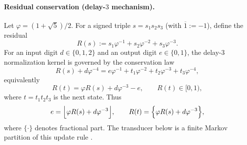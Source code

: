 \paragraph{Residual conservation (delay-$3$ mechanism).}
Let $\varphi=(1+\sqrt5)/2$.
For a signed triple $s=s_1s_2s_3$ (with $\overline{1}:=-1$), define the residual
\[
R(s):=s_1\varphi^{-1}+s_2\varphi^{-2}+s_3\varphi^{-3}.
\]
For an input digit $d\in\{0,1,2\}$ and an output digit $e\in\{0,1\}$, the delay-$3$ normalization kernel is governed by the conservation law
\begin{equation}\label{eq:online-delay3-conservation}
R(s)+d\varphi^{-4}=e\varphi^{-1}+t_1\varphi^{-2}+t_2\varphi^{-3}+t_3\varphi^{-4},
\end{equation}
equivalently
\begin{equation}\label{eq:online-delay3-update}
R(t)=\varphi R(s)+d\varphi^{-3}-e,
\qquad R(t)\in[0,1),
\end{equation}
where $t=t_1t_2t_3$ is the next state.
Thus
\begin{equation}\label{eq:online-delay3-floor}
e=\Bigl\lfloor \varphi R(s)+d\varphi^{-3}\Bigr\rfloor,\qquad
R(t)=\Bigl\{\varphi R(s)+d\varphi^{-3}\Bigr\},
\end{equation}
where $\{\cdot\}$ denotes fractional part.
The transducer below is a finite Markov partition of this update rule \cite{Frougny1999OnlineAddition}.

